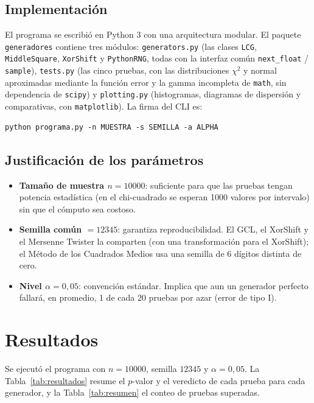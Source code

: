 \documentclass[11pt]{article}
\begin{document}
\subsection{Implementaci\'on}

El programa se escribi\'o en Python 3 con una arquitectura modular. El
paquete \texttt{generadores} contiene tres m\'odulos:
\texttt{generators.py} (las clases \texttt{LCG}, \texttt{MiddleSquare},
\texttt{XorShift} y \texttt{PythonRNG}, todas con la interfaz com\'un
\texttt{next\_float} / \texttt{sample}), \texttt{tests.py} (las cinco
pruebas, con las distribuciones $\chi^2$ y normal aproximadas mediante la
funci\'on error y la gamma incompleta de \texttt{math}, sin dependencia de
\texttt{scipy}) y \texttt{plotting.py} (histogramas, diagramas de
dispersi\'on y comparativas, con \texttt{matplotlib}). La firma del CLI es:

\begin{verbatim}
python programa.py -n MUESTRA -s SEMILLA -a ALPHA
\end{verbatim}

\subsection{Justificaci\'on de los par\'ametros}

\begin{itemize}
  \item \textbf{Tama\~no de muestra $n = 10000$}: suficiente para que las
    pruebas tengan potencia estad\'istica (en el chi-cuadrado se esperan
    1000 valores por intervalo) sin que el c\'omputo sea costoso.
  \item \textbf{Semilla com\'un $= 12345$}: garantiza reproducibilidad.
    El GCL, el XorShift y el Mersenne Twister la comparten (con una
    transformaci\'on para el XorShift); el M\'etodo de los Cuadrados
    Medios usa una semilla de 6 d\'igitos distinta de cero.
  \item \textbf{Nivel $\alpha = 0{,}05$}: convenci\'on est\'andar. Implica
    que aun un generador perfecto fallar\'a, en promedio, 1 de cada 20
    pruebas por azar (error de tipo I).
\end{itemize}

\section{Resultados}

Se ejecut\'o el programa con $n = 10000$, semilla $12345$ y
$\alpha = 0{,}05$. La Tabla~\ref{tab:resultados} resume el $p$-valor y el
veredicto de cada prueba para cada generador, y la
Tabla~\ref{tab:resumen} el conteo de pruebas superadas.
\end{document}
